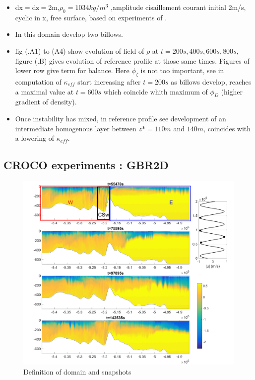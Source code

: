 \begin{itemize}
\item dx$=$dz$=$2m,$\rho_0 = 1034kg/m^3$ ,amplitude cisaillement courant initial 2m/s, cyclic in x, free surface, based on experiments of \citet{penney_2020}.
\item In this domain develop two billows.
\item fig (.A1) to (A4) show evolution of field of $\rho$ at $t=200s,400s,600s,800s$, figure (.B) gives evolution of reference profile at those same times. Figures of lower row give term for balance. Here $\phi_{\zeta}$ is not too important, see in computation of $\kappa_{eff}$ start increasing after $t=200s$ as billows develop, reaches a maximal value at $t=600s$ which coincide whith maximum of $\phi_D$ (higher gradient of density).
\item Once instability has mixed, in reference profile see development of an intermediate homogenous layer between $z*=110m$ and $140m$, coincides with a lowering of $\kappa_{eff}$.
\end{itemize}

\subsection{CROCO experiments : GBR2D}
\begin{figure}[h!]
\centering
\includegraphics[width=1\textwidth]{./CHAP_BPE/Fig_Kappa_CS_ex.png}
\caption{Definition of domain and snapshots}
\label{figCgbr2d_ex}
\end{figure}


